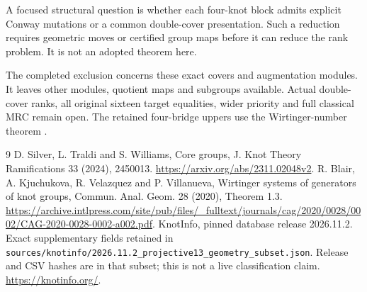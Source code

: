 \documentclass[11pt]{article}
\begin{document}
A focused structural question is whether each four-knot block
admits explicit Conway mutations or a common double-cover
presentation. Such a reduction requires geometric moves or
certified group maps before it can reduce the rank problem.
It is not an adopted theorem here.

The completed exclusion concerns these exact covers and
augmentation modules. It leaves other modules, quotient
maps and subgroups available. Actual double-cover ranks,
all original sixteen target equalities, wider priority and
full classical MRC remain open. The retained four-bridge
uppers use the Wirtinger-number theorem \cite{wirt}.

\clearpage
\begin{thebibliography}{9}
\small
{} D. Silver, L. Traldi and S. Williams, Core
groups, J. Knot Theory Ramifications 33 (2024), 2450013.
\url{https://arxiv.org/abs/2311.02048v2}.
 R. Blair, A. Kjuchukova, R. Velazquez and P.
Villanueva, Wirtinger systems of generators of knot groups,
Commun. Anal. Geom. 28 (2020), Theorem 1.3.
\url{https://archive.intlpress.com/site/pub/files/_fulltext/journals/cag/2020/0028/0002/CAG-2020-0028-0002-a002.pdf}.
 KnotInfo, pinned database release 2026.11.2.
Exact supplementary fields retained in
\texttt{sources/knotinfo/2026.11.2\_projective13\_geometry\_subset.json}.
Release and CSV hashes are in that subset; this is not a live
classification claim. \url{https://knotinfo.org/}.
\end{thebibliography}
\end{document}
